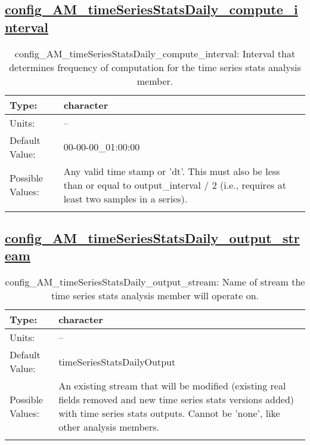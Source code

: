 \subsection[config\_AM\_timeSeriesStatsDaily\_compute\_interval]{\hyperref[sec:nm_tab_AM_timeSeriesStatsDaily]{config\_AM\_timeSeriesStatsDaily\_compute\_interval}}
\label{subsec:nm_sec_config_AM_timeSeriesStatsDaily_compute_interval}
\begin{center}
\begin{longtable}{| p{2.0in} || p{4.0in} |}
    \hline
    Type: & character \\
    \hline
    Units: & -- \\
    \hline
    Default Value: & 00-00-00\_01:00:00 \\
    \hline
    Possible Values: & Any valid time stamp or 'dt'. This must also be less than or equal to output\_interval / 2 (i.e., requires at least two samples in a series). \\
    \hline
    \caption{config\_AM\_timeSeriesStatsDaily\_compute\_interval: Interval that determines frequency of computation for the time series stats analysis member.}
\end{longtable}
\end{center}
\subsection[config\_AM\_timeSeriesStatsDaily\_output\_stream]{\hyperref[sec:nm_tab_AM_timeSeriesStatsDaily]{config\_AM\_timeSeriesStatsDaily\_output\_stream}}
\label{subsec:nm_sec_config_AM_timeSeriesStatsDaily_output_stream}
\begin{center}
\begin{longtable}{| p{2.0in} || p{4.0in} |}
    \hline
    Type: & character \\
    \hline
    Units: & -- \\
    \hline
    Default Value: & timeSeriesStatsDailyOutput \\
    \hline
    Possible Values: & An existing stream that will be modified (existing real fields removed and new time series stats versions added) with time series stats outputs. Cannot be 'none', like other analysis members. \\
    \hline
    \caption{config\_AM\_timeSeriesStatsDaily\_output\_stream: Name of stream the time series stats analysis member will operate on.}
\end{longtable}
\end{center}
